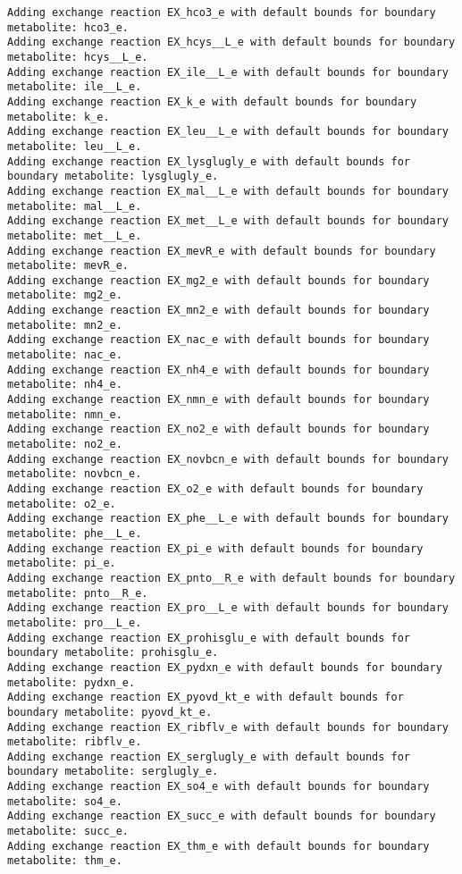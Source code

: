 \documentclass[
  letterpaper,
  DIV=11,
  numbers=noendperiod]{scrartcl}
\begin{document}
\begin{verbatim}
Adding exchange reaction EX_hco3_e with default bounds for boundary metabolite: hco3_e.
Adding exchange reaction EX_hcys__L_e with default bounds for boundary metabolite: hcys__L_e.
Adding exchange reaction EX_ile__L_e with default bounds for boundary metabolite: ile__L_e.
Adding exchange reaction EX_k_e with default bounds for boundary metabolite: k_e.
Adding exchange reaction EX_leu__L_e with default bounds for boundary metabolite: leu__L_e.
Adding exchange reaction EX_lysglugly_e with default bounds for boundary metabolite: lysglugly_e.
Adding exchange reaction EX_mal__L_e with default bounds for boundary metabolite: mal__L_e.
Adding exchange reaction EX_met__L_e with default bounds for boundary metabolite: met__L_e.
Adding exchange reaction EX_mevR_e with default bounds for boundary metabolite: mevR_e.
Adding exchange reaction EX_mg2_e with default bounds for boundary metabolite: mg2_e.
Adding exchange reaction EX_mn2_e with default bounds for boundary metabolite: mn2_e.
Adding exchange reaction EX_nac_e with default bounds for boundary metabolite: nac_e.
Adding exchange reaction EX_nh4_e with default bounds for boundary metabolite: nh4_e.
Adding exchange reaction EX_nmn_e with default bounds for boundary metabolite: nmn_e.
Adding exchange reaction EX_no2_e with default bounds for boundary metabolite: no2_e.
Adding exchange reaction EX_novbcn_e with default bounds for boundary metabolite: novbcn_e.
Adding exchange reaction EX_o2_e with default bounds for boundary metabolite: o2_e.
Adding exchange reaction EX_phe__L_e with default bounds for boundary metabolite: phe__L_e.
Adding exchange reaction EX_pi_e with default bounds for boundary metabolite: pi_e.
Adding exchange reaction EX_pnto__R_e with default bounds for boundary metabolite: pnto__R_e.
Adding exchange reaction EX_pro__L_e with default bounds for boundary metabolite: pro__L_e.
Adding exchange reaction EX_prohisglu_e with default bounds for boundary metabolite: prohisglu_e.
Adding exchange reaction EX_pydxn_e with default bounds for boundary metabolite: pydxn_e.
Adding exchange reaction EX_pyovd_kt_e with default bounds for boundary metabolite: pyovd_kt_e.
Adding exchange reaction EX_ribflv_e with default bounds for boundary metabolite: ribflv_e.
Adding exchange reaction EX_serglugly_e with default bounds for boundary metabolite: serglugly_e.
Adding exchange reaction EX_so4_e with default bounds for boundary metabolite: so4_e.
Adding exchange reaction EX_succ_e with default bounds for boundary metabolite: succ_e.
Adding exchange reaction EX_thm_e with default bounds for boundary metabolite: thm_e.

\end{verbatim}
\end{document}
